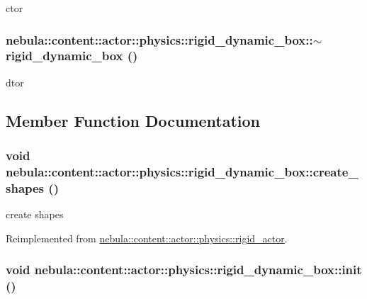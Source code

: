 ctor \hypertarget{classnebula_1_1content_1_1actor_1_1physics_1_1rigid__dynamic__box_a9c5f1f870a18f992cde29294f34f3303}{
\subsubsection[{$\sim$rigid\_\-dynamic\_\-box}]{\setlength{\rightskip}{0pt plus 5cm}nebula::content::actor::physics::rigid\_\-dynamic\_\-box::$\sim$rigid\_\-dynamic\_\-box ()}}
\label{classnebula_1_1content_1_1actor_1_1physics_1_1rigid__dynamic__box_a9c5f1f870a18f992cde29294f34f3303}


dtor 

\subsection{Member Function Documentation}
\hypertarget{classnebula_1_1content_1_1actor_1_1physics_1_1rigid__dynamic__box_a77dc2beadcdfda10eeb5ef1abed6ee5e}{
\subsubsection[{create\_\-shapes}]{\setlength{\rightskip}{0pt plus 5cm}void nebula::content::actor::physics::rigid\_\-dynamic\_\-box::create\_\-shapes ()}}
\label{classnebula_1_1content_1_1actor_1_1physics_1_1rigid__dynamic__box_a77dc2beadcdfda10eeb5ef1abed6ee5e}


create shapes 

Reimplemented from \hyperlink{classnebula_1_1content_1_1actor_1_1physics_1_1rigid__actor_a5ada308047050540ae655a7fe7ff8a3e}{nebula::content::actor::physics::rigid\_\-actor}.\hypertarget{classnebula_1_1content_1_1actor_1_1physics_1_1rigid__dynamic__box_a235e20a7e695a39c7ccb0100b90c10ee}{
\subsubsection[{init}]{\setlength{\rightskip}{0pt plus 5cm}void nebula::content::actor::physics::rigid\_\-dynamic\_\-box::init ()}}
\label{classnebula_1_1content_1_1actor_1_1physics_1_1rigid__dynamic__box_a235e20a7e695a39c7ccb0100b90c10ee}


